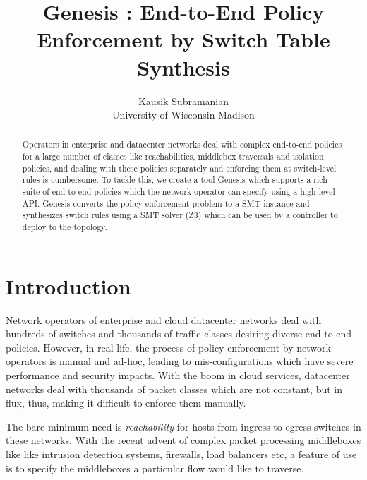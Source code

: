 \documentclass[]{sig}
\title{Genesis : End-to-End Policy Enforcement by Switch Table Synthesis }
\author{Kausik Subramanian \\
	University of Wisconsin-Madison}
\begin{document}
\maketitle

\begin{abstract}
Operators in enterprise and datacenter networks deal with complex end-to-end policies for a large number of classes like reachabilities, middlebox traversals and isolation policies, and dealing with these policies separately and enforcing them at switch-level rules is cumbersome. To tackle this, we create a tool Genesis which supports a rich suite of end-to-end policies which the network operator can specify using a high-level API. Genesis converts the policy enforcement problem to a SMT instance and synthesizes switch rules using a SMT solver (Z3) which can be used by a controller to deploy to the topology.
\end{abstract}

\section{Introduction}
Network operators of enterprise and cloud datacenter networks deal with hundreds of switches and thousands of traffic classes desiring diverse end-to-end policies. However, in real-life, the process of policy enforcement by network operators is manual and ad-hoc, leading to mis-configurations which have severe performance and security impacts. With the boom in cloud services, datacenter networks deal with thousands of packet classes which are not constant, but in flux, thus, making it difficult to enforce them manually. 

The bare minimum need is \emph{reachability} for hosts from ingress to egress switches in these networks. 
 With the recent advent of complex packet processing middleboxes like like intrusion detection systems, firewalls, load balancers etc, a feature of use is to specify the middleboxes a particular flow would like to traverse. 
\end{document}
